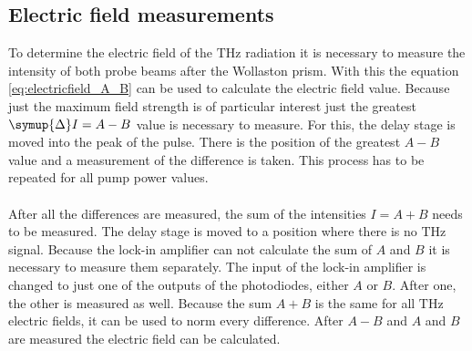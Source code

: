 \subsection{Electric field measurements}
\label{sec:field}
To determine the electric field of the $\si{\tera\hertz}$ radiation it is necessary to measure the intensity of both probe beams after the Wollaston prism.
With this the equation \eqref{eq:electricfield_A_B} can be used to calculate the electric field value.
Because just the maximum field strength is of particular interest just the greatest $\symup{\Delta}I = A-B$ value is necessary to measure.
For this, the delay stage is moved into the peak of the pulse.
There is the position of the greatest $A-B$ value and a measurement of the difference is taken.
This process has to be repeated for all pump power values.
\\\\
After all the differences are measured, the sum of the intensities $I = A + B$ needs to be measured.
The delay stage is moved to a position where there is no $\si{\tera\hertz}$ signal.
Because the lock-in amplifier can not calculate the sum of $A$ and $B$ it is necessary to measure them separately.
The input of the lock-in amplifier is changed to just one of the outputs of the photodiodes, either $A$ or $B$.
After one, the other is measured as well.
Because the sum $A+B$ is the same for all $\si{\tera\hertz}$ electric fields, it can be used to norm every difference.
After $A-B$ and $A$ and $B$ are measured the electric field can be calculated.

